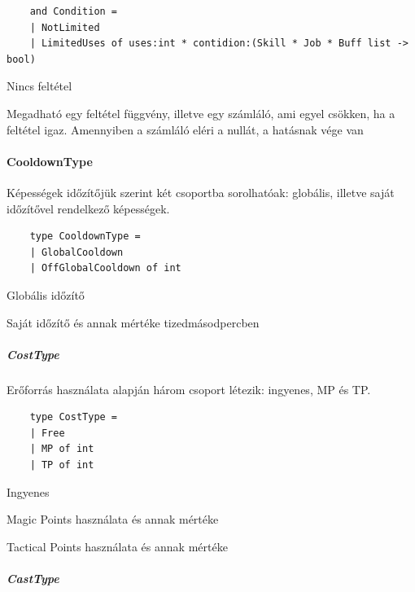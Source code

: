 \documentclass[12pt]{article}
\begin{document}
	\begin{lstlisting}
	and Condition =
	| NotLimited
	| LimitedUses of uses:int * contidion:(Skill * Job * Buff list -> bool)
	\end{lstlisting}
	
	\begin{description}[align=left,labelwidth=2.5cm]
		\item [NotLimited] Nincs feltétel
		\item [LimitedUses] Megadható egy feltétel függvény, illetve egy számláló, ami egyel csökken, ha a feltétel igaz. Amennyiben a számláló eléri a nullát, a hatásnak vége van
	\end{description}
	
	\paragraph{CooldownType}
	
	Képességek időzítőjük szerint két csoportba sorolhatóak: globális, illetve saját időzítővel rendelkező képességek.
	
	\begin{lstlisting}
	type CooldownType =
	| GlobalCooldown
	| OffGlobalCooldown of int
	\end{lstlisting}
	
	\begin{description}[align=left,labelwidth=3.5cm]
		\item [GlobalCooldown] Globális időzítő
		\item [OffGlobalCooldown] Saját időzítő és annak mértéke tizedmásodpercben
	\end{description}
	
	\subparagraph{CostType}
	
	Erőforrás használata alapján három csoport létezik: ingyenes, MP és TP.
	
	\begin{lstlisting}
	type CostType =
	| Free
	| MP of int
	| TP of int
	\end{lstlisting}
	
	\begin{description}[align=left,labelwidth=2.5cm]
		\item [Free] Ingyenes
		\item [MP] Magic Points használata és annak mértéke
		\item [TP] Tactical Points használata és annak mértéke
	\end{description}
	
	\subparagraph{CastType}
	
\end{document}
